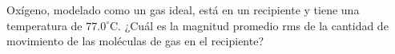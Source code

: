 \item Oxígeno, modelado como un gas ideal, está en un recipiente y tiene una temperatura de $77.0^\circ\text{C}$. ¿Cuál es la magnitud promedio rms de la cantidad de movimiento de las moléculas de gas en el recipiente?
